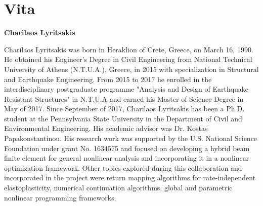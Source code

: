 \chapter*{Vita}
\thispagestyle{empty}
\begin{center}
	\textbf{\large Charilaos Lyritsakis}
\end{center}
Charilaos Lyritsakis was born in Heraklion of Crete, Greece, on March 16, 1990. 
He obtained his Engineer's Degree in Civil Engineering from National Technical 
University of Athens (N.T.U.A.), Greece, in 2015 with specialization in 
Structural and Earthquake Engineering. From 2015 to 2017 he enrolled in the 
interdisciplinary postgraduate programme "Analysis and Design of Earthquake 
Resistant Structures" in N.T.U.A and earned his Master of Science Degree in May 
of 2017. Since September of 2017, Charilaos Lyritsakis has been a Ph.D. student 
at the Pennsylvania State University in the Department of Civil and 
Environmental Engineering. His academic advisor was Dr. Kostas 
Papakonstantinou. His research work was supported by the U.S. National Science 
Foundation under grant No. 1634575 and focused on developing a hybrid beam 
finite element for general nonlinear analysis and incorporating it in a 
nonlinear optimization framework. Other topics explored during this 
collaboration and incorporated in the project were return mapping algorithms 
for rate-independent elastoplasticity, numerical continuation algorithms, 
global and parametric nonlinear programming frameworks.
